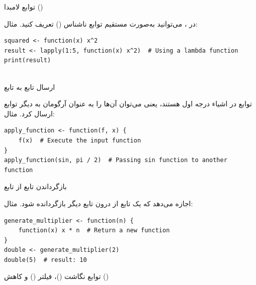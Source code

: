 \documentclass[11pt, a4paper, oneside]{book}
\newcounter{itemadded}
\let\LaTeXStandardEnumerateBegin\enumerate
\let\LaTeXStandardEnumerateEnd\endenumerate
\renewenvironment{enumerate}{%
	\LaTeXStandardEnumerateBegin%
	\setcounter{itemadded}{0}
}{%
	\LaTeXStandardEnumerateEnd%
}%
\begin{document}
			\begin{enumerate}
				
				\item {\large توابع لامبدا ()} \par
				در ، می‌توانید به‌صورت مستقیم توابع ناشناس () تعریف کنید.
				مثال:
					\begin{latin}
						\begin{lstlisting}[caption={\lr{Lambda Functions}}] 
squared <- function(x) x^2
result <- lapply(1:5, function(x) x^2)  # Using a lambda function
print(result)
		
						\end{lstlisting}
					\end{latin}
				
				
				\item {\large ارسال تابع به تابع} \par
				توابع در  اشیاء درجه اول هستند، یعنی می‌توان آن‌ها را به عنوان آرگومان به دیگر توابع ارسال کرد.
				مثال:
					\begin{latin}
						\begin{lstlisting}[caption={\lr{Passing function to another function}}] 
apply_function <- function(f, x) {
	f(x)  # Execute the input function
}
apply_function(sin, pi / 2)  # Passing sin function to another function

						\end{lstlisting}
					\end{latin}
				
				\item {\large بازگرداندن تابع از تابع} \par
				 اجازه می‌دهد که یک تابع از درون تابع دیگر بازگردانده شود.
				مثال:
					\begin{latin}
						\begin{lstlisting}[caption={\lr{Return a function into function}}] 
generate_multiplier <- function(n) {
	function(x) x * n  # Return a new function
}
double <- generate_multiplier(2)
double(5)  # result: 10

						\end{lstlisting}
					\end{latin}
				
				\item {\large توابع نگاشت ()، فیلتر () و کاهش ()} \par
				
					\begin{itemize}
						

\end{itemize}
\end{enumerate}
\end{document}
